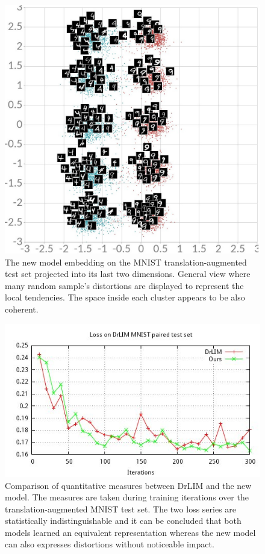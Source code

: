 \documentclass[a4paper,12pt]{report}
\begin{document}
\begin{figure}
    \centering
    \includegraphics[width=\textwidth]{thesis_figures/mnist_cl2d2.jpg}
    \caption{The new model embedding on the MNIST translation-augmented test set projected into its last two dimensions.
    General view where many random sample's distortions are displayed to represent the local tendencies.
    The space inside each cluster appears to be also coherent.
    }
    \label{fig:mnist_cl2d_2}
\end{figure}

\begin{figure}[h]
    \begin{center}
        \includegraphics{thesis_figures/final_loss_test2bv7.jpg}
    \end{center}
    \caption{Comparison of quantitative measures between DrLIM and the new model.
    The measures are taken during training iterations over the translation-augmented MNIST test set.
    The two loss series are statistically indistinguishable and it can be concluded that both models learned an equivalent representation whereas the new model can also expresses distortions without noticeable impact.
    }
    \label{fig:loss_mnist_test_common}
\end{figure}
\end{document}
